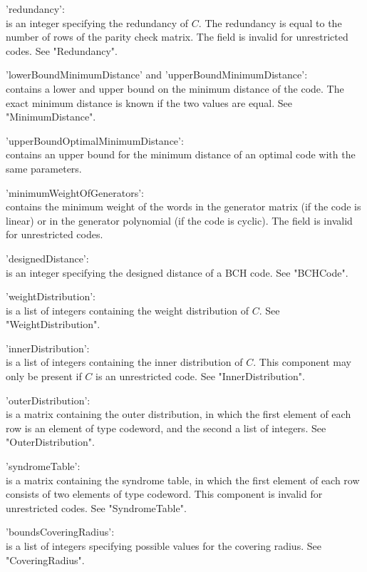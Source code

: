 'redundancy': \\
        is an integer specifying the redundancy of $C$. The redundancy is
        equal to the number of rows of the parity check matrix. The field
        is invalid for unrestricted codes. See "Redundancy".

'lowerBoundMinimumDistance' and 'upperBoundMinimumDistance': \\
        contains a  lower and upper bound on  the minimum distance of the
        code.  The exact minimum distance is known if  the two values are
        equal. See "MinimumDistance".

'upperBoundOptimalMinimumDistance': \\
        contains an  upper bound for the  minimum distance  of an optimal
        code with the same parameters.

'minimumWeightOfGenerators': \\
        contains the minimum weight of the  words in the generator matrix
        (if the code is  linear) or in  the generator polynomial  (if the
        code is cyclic). The field is invalid for unrestricted codes.

'designedDistance': \\
        is an integer  specifying the  designed distance  of a BCH  code.
        See "BCHCode".

'weightDistribution': \\
        is a list of integers containing the  weight distribution of $C$.
        See "WeightDistribution".

'innerDistribution': \\
        is   a list of   integers containing  the   inner distribution of
        $C$. This component may only be present if $C$ is an unrestricted
        code. See "InnerDistribution".

'outerDistribution': \\
        is a matrix containing the outer distribution, in which the first
        element  of each  row  is an element  of  type codeword,  and the
        second a list of integers. See "OuterDistribution".

'syndromeTable': \\
        is a  matrix  containing the syndrome table,   in which the first
        element    of  each  row  consists   of   two  elements   of type
        codeword. This component  is invalid for unrestricted codes.  See
        "SyndromeTable".

'boundsCoveringRadius': \\
        is a list of integers specifying possible values for the covering 
        radius.  See "CoveringRadius".

